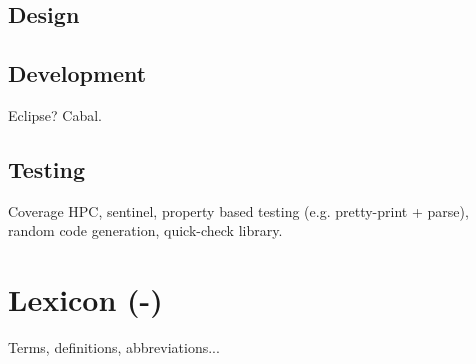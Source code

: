 \documentclass[a4paper,12pt,abstracton,titlepage]{scrartcl}
\begin{document}
\subsection{Design}
\lipsum[1]

\subsection{Development}
Eclipse? Cabal.

\subsection{Testing}
Coverage HPC, sentinel, property based testing (e.g. pretty-print + parse), random code generation, quick-check library.

\newpage
\appendix
\section{Lexicon (-)}
\label{sec:lexicon}
Terms, definitions, abbreviations...
\end{document}
